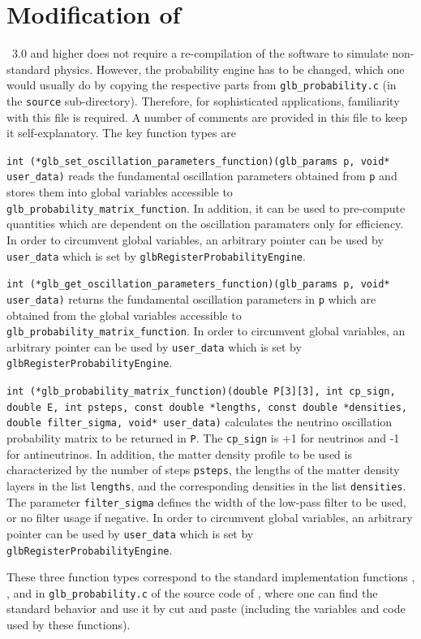 \section{Modification of \GLOBES }

\GLOBES\ 3.0 and higher does not require a re-compilation of the software to simulate non-standard physics.
However, the probability engine has to be changed, which one would usually do by copying the respective parts from {\tt glb\_probability.c} (in the {\tt source} sub-directory). Therefore, for sophisticated applications, familiarity with this file is required. A number of comments are provided in this file to keep it self-explanatory.
The key function types are
\begin{function}
{\tt int (*glb\_set\_oscillation\_parameters\_function)(glb\_params p, void* user\_data)} reads the fundamental oscillation parameters
obtained from {\tt p} and stores them into global variables accessible to {\tt glb\_probability\_matrix\_function}.
 In addition, it can be used to pre-compute quantities which are dependent on the oscillation paramaters only for efficiency. 
In order to circumvent global variables, an arbitrary pointer can be used by {\tt user\_data} which is set by {\tt glbRegisterProbabilityEngine}.
\end{function}
\begin{function}
{\tt int (*glb\_get\_oscillation\_parameters\_function)(glb\_params p, void* user\_data)} returns the fundamental oscillation parameters
in {\tt p} which are obtained from the global variables accessible to {\tt glb\_probability\_matrix\_function}.
In order to circumvent global variables, an arbitrary pointer can be used by {\tt user\_data} which is set by {\tt glbRegisterProbabilityEngine}.
\end{function}
\begin{function}
{\tt int (*glb\_probability\_matrix\_function)(double P[3][3], int cp\_sign, double E,
                  int psteps, const double *lengths, const double *densities,
                  double filter\_sigma, void* user\_data)} calculates the neutrino oscillation probability matrix to be returned in {\tt P}. The {\tt cp\_sign} is +1 for neutrinos and -1 for antineutrinos. In addition, the matter density profile to be used is characterized by the number of steps {\tt psteps}, the lengths of the matter density layers in the list {\tt lengths}, and the corresponding densities in the list {\tt densities}. The parameter {\tt filter\_sigma} defines the width of the low-pass filter to be used, or no filter usage if negative.
In order to circumvent global variables, an arbitrary pointer can be used by {\tt user\_data} which is set by {\tt glbRegisterProbabilityEngine}.
\end{function}
These three function types correspond to the standard implementation functions , , and  in {\tt glb\_probability.c} of the source code of \GLOBES , where one can find the standard behavior and use it by cut and paste (including the variables and code used by these functions).

